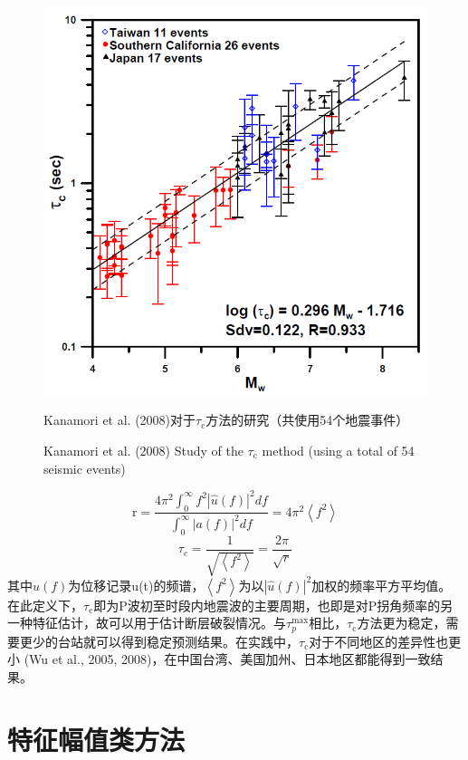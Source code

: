 \begin{figure}[!h] 
\centering 
 \includegraphics[width=0.7\linewidth]{img/kanamori2008_taoc.jpg} 
 \renewcommand{\figurename}{图} 
\caption{Kanamori et al. (2008)对于$\tau_{\mathrm{c}}$方法的研究（共使用54个地震事件）} 
\addtocounter{figure}{-1} \vspace{-5pt} 
\renewcommand{\figurename}{Fig} 
\caption{Kanamori et al. (2008) Study of the $\tau_{\mathrm{c}}$ method (using a total of 54 seismic events)} 
\renewcommand{\figurename}{图} 
\label{fig:network-device-influence.png} 
\end{figure}

\begin{equation}
\mathrm{r}=\frac{4 \pi^{2} \int_{0}^{\infty} f^{2}|\widehat{u}(f)|^{2} d f}{\int_{0}^{\infty}|a(f)|^{2} d f}=4 \pi^{2}\left\langle f^{2}\right\rangle
\end{equation}
\begin{equation}
\tau_{c}=\frac{1}{\sqrt{\left\langle f^{2}\right\rangle}}=\frac{2 \pi}{\sqrt{r}}
\end{equation}
其中$\widehat{u}(f)$为位移记录u(t)的频谱，$\left\langle f^{2}\right\rangle$为以$|\hat{u}(f)|^{2}$加权的频率平方平均值。在此定义下，$\tau_{\mathrm{c}}$即为P波初至时段内地震波的主要周期，也即是对P拐角频率的另一种特征估计，故可以用于估计断层破裂情况。与$\tau_{p}^{\max}$相比，$\tau_{\mathrm{c}}$方法更为稳定，需要更少的台站就可以得到稳定预测结果。在实践中，$\tau_{\mathrm{c}}$对于不同地区的差异性也更小 (Wu et al., 2005, 2008)，在中国台湾、美国加州、日本地区都能得到一致结果。\\

\section{特征幅值类方法}

